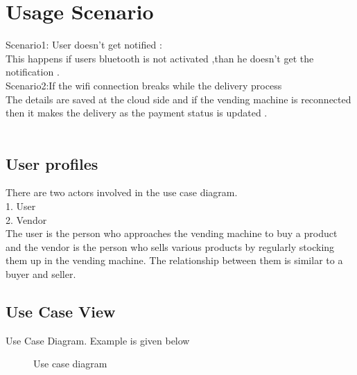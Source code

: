 \documentclass[oneside,a4paper,12pt]{report}
\begin{document}
\section{Usage Scenario}
Scenario1: User doesn't get notified :\\
This happens if users bluetooth is not activated ,than he doesn't get the notification .\\
Scenario2:If the wifi connection breaks while the delivery process\\
The details are saved at the cloud side and if the vending machine  is reconnected then it makes the delivery as the payment status is updated .\\\

 \subsection{User profiles}  
There are two actors involved in the use case diagram.\\
1. User\\
2. Vendor\\
The user is the person who approaches the vending machine to buy a product and the vendor is
the person who sells various products by regularly stocking them up in the vending machine. The
relationship between them is similar to a buyer and seller.\\

\subsection{Use Case View}
Use Case Diagram. Example is given below
\begin{center}
	\begin{figure}[!htbp]
		\centering
	  \caption{Use case diagram}
	  \label{fig:usecase}
	\end{figure}
\end{center}  
\newpage
\end{document}
